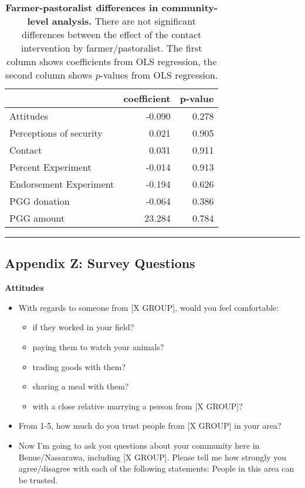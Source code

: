 \documentclass[
]{article}
\providecommand{\tightlist}{%
  \setlength{\itemsep}{0pt}\setlength{\parskip}{0pt}}
\begin{document}
\begin{table}[H]
\begin{center}
\label{tab:farm_tab}
\caption{\textbf{Farmer-pastoralist differences in community-level analysis.} There are not significant differences between the effect of the contact intervention by farmer/pastoralist. The first column shows coefficients from OLS regression, the second column shows $p$-values from OLS regression.}
\smallskip

\begin{tabular}{l|r|r}
\hline
  & coefficient & p-value\\
\hline
Attitudes & -0.090 & 0.278\\
\hline
Perceptions of security & 0.021 & 0.905\\
\hline
Contact & 0.031 & 0.911\\
\hline
Percent Experiment & -0.014 & 0.913\\
\hline
Endorsement Experiment & -0.194 & 0.626\\
\hline
PGG donation & -0.064 & 0.386\\
\hline
PGG amount & 23.284 & 0.784\\
\hline
\end{tabular}


\end{center}
\end{table}

\begin{center}\rule{0.5\linewidth}{0.5pt}\end{center}

\hypertarget{appendix-z-survey-questions}{%
\subsection{Appendix Z: Survey
Questions}\label{appendix-z-survey-questions}}

\textbf{Attitudes}

\begin{itemize}
\tightlist
\item
  With regards to someone from {[}X GROUP{]}, would you feel
  comfortable:

  \begin{itemize}
  \tightlist
  \item
    if they worked in your field?
  \item
    paying them to watch your animals?
  \item
    trading goods with them?
  \item
    sharing a meal with them?
  \item
    with a close relative marrying a person from {[}X GROUP{]}?
  \end{itemize}
\item
  From 1-5, how much do you trust people from {[}X GROUP{]} in your
  area?
\item
  Now I'm going to ask you questions about your community here in
  Benue/Nassarawa, including {[}X GROUP{]}. Please tell me how strongly
  you agree/disagree with each of the following statements: People in
  this area can be trusted.
\end{itemize}
\end{document}
